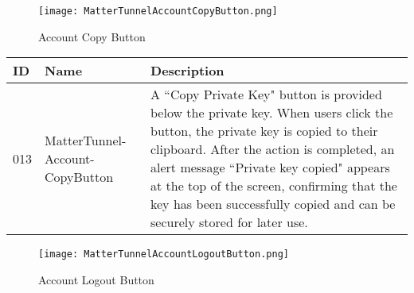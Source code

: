 \documentclass[conference]{IEEEtran}
\begin{document}
\begin{enumerate}[itemsep=2ex, parsep=1ex]
\begin{enumerate}[itemsep=2ex, parsep=1ex]
                  \vspace{30cm}
	      	                        
	      	      \begin{figure}[h!]
	      	      	\centering
	      	      	\texttt{[image: MatterTunnelAccountCopyButton.png]}
	      	      	\caption{Account Copy Button}
	      	      	\label{fig:MatterTunnelAccountCopyButton}
	      	      \end{figure}
	      	      	      	      
	      	      \begin{table}[h!]
	      	      	\def\arraystretch{1.24} \small
	      	      	\begin{tabular}{|p{1.2cm}|p{2.5cm}|p{4.0cm}|}
	      	      		\hline
	      	      		ID  & Name                            & Description                                                                                                                                                                                                                                                                                                                                       \\
	      	      		\hline
	      	      		013 & MatterTunnel-Account-CopyButton & A ``Copy Private Key" button is provided below the private key. When users click the button, the private key is copied to their clipboard. After the action is completed, an alert message ``Private key copied" appears at the top of the screen, confirming that the key has been successfully copied and can be securely stored for later use. \\
	      	      		\hline
	      	      	\end{tabular}
	      	      \end{table}

                  \vspace{5cm}
	      	      
	      	      \begin{figure}[h!]
	      	      	\centering
	      	      	\texttt{[image: MatterTunnelAccountLogoutButton.png]}
	      	      	\caption{Account Logout Button}
	      	      	\label{fig:MatterTunnelAccountLogoutButton}
	      	      \end{figure}
	      	      	      	      

\end{enumerate}
\end{enumerate}
\end{document}
